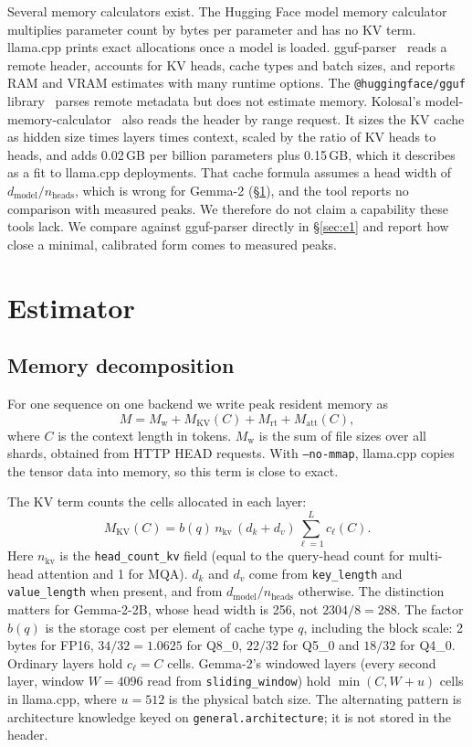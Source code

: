 \documentclass[conference]{IEEEtran}
\begin{document}
Several memory calculators exist. The Hugging Face model memory calculator~\cite{hfcalc} multiplies parameter count by bytes per parameter and has no KV term. llama.cpp prints exact allocations once a model is loaded. gguf-parser~\cite{ggufparser} reads a remote header, accounts for KV heads, cache types and batch sizes, and reports RAM and VRAM estimates with many runtime options. The \texttt{@huggingface/gguf} library~\cite{hfgguf} parses remote metadata but does not estimate memory. Kolosal's model-memory-calculator~\cite{kolosal} also reads the header by range request. It sizes the KV cache as hidden size times layers times context, scaled by the ratio of KV heads to heads, and adds 0.02\,GB per billion parameters plus 0.15\,GB, which it describes as a fit to llama.cpp deployments. That cache formula assumes a head width of $d_{\mathrm{model}}/n_{\mathrm{heads}}$, which is wrong for Gemma-2 (\S\ref{sec:est}), and the tool reports no comparison with measured peaks. We therefore do not claim a capability these tools lack. We compare against gguf-parser directly in \S\ref{sec:e1} and report how close a minimal, calibrated form comes to measured peaks.

\section{Estimator}\label{sec:est}
\label{sec:method}
\subsection{Memory decomposition}
For one sequence on one backend we write peak resident memory as
\begin{equation}
M = M_{\mathrm{w}} + M_{\mathrm{KV}}(C) + M_{\mathrm{rt}} + M_{\mathrm{att}}(C),
\label{eq:decomp}
\end{equation}
where $C$ is the context length in tokens. $M_{\mathrm{w}}$ is the sum of file sizes over all shards, obtained from HTTP HEAD requests. With \texttt{--no-mmap}, llama.cpp copies the tensor data into memory, so this term is close to exact.

The KV term counts the cells allocated in each layer:
\begin{equation}
M_{\mathrm{KV}}(C) = b(q)\, n_{\mathrm{kv}}\, (d_k + d_v) \sum_{\ell=1}^{L} c_\ell(C).
\label{eq:kv}
\end{equation}
Here $n_{\mathrm{kv}}$ is the \texttt{head\_count\_kv} field (equal to the query-head count for multi-head attention and 1 for MQA). $d_k$ and $d_v$ come from \texttt{key\_length} and \texttt{value\_length} when present, and from $d_{\mathrm{model}}/n_{\mathrm{heads}}$ otherwise. The distinction matters for Gemma-2-2B, whose head width is 256, not $2304/8 = 288$. The factor $b(q)$ is the storage cost per element of cache type $q$, including the block scale: 2 bytes for FP16, $34/32 = 1.0625$ for Q8\_0, $22/32$ for Q5\_0 and $18/32$ for Q4\_0. Ordinary layers hold $c_\ell = C$ cells. Gemma-2's windowed layers (every second layer, window $W = 4096$ read from \texttt{sliding\_window}) hold $\min(C, W + u)$ cells in llama.cpp, where $u = 512$ is the physical batch size. The alternating pattern is architecture knowledge keyed on \texttt{general.architecture}; it is not stored in the header.
\end{document}
